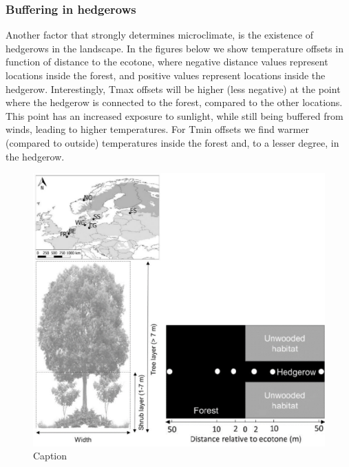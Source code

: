 \documentclass[12pt,oneside]{book}
\begin{document}
\subsubsection{Buffering in hedgerows}\label{buffering-in-hedgerows}

Another factor that strongly determines microclimate, is the existence
of hedgerows in the landscape. In the figures below we show temperature
offsets in function of distance to the ecotone, where negative distance
values represent locations inside the forest, and positive values
represent locations inside the hedgerow. Interestingly, Tmax offsets
will be higher (less negative) at the point where the hedgerow is
connected to the forest, compared to the other locations. This point has
an increased exposure to sunlight, while still being buffered from
winds, leading to higher temperatures. For Tmin offsets we find warmer
(compared to outside) temperatures inside the forest and, to a lesser
degree, in the hedgerow.

\begin{figure}

{\centering \includegraphics[width=1\linewidth]{figures/Figure1028} 

}

\caption{Caption}\label{fig:Micro28}
\end{figure}
\end{document}
